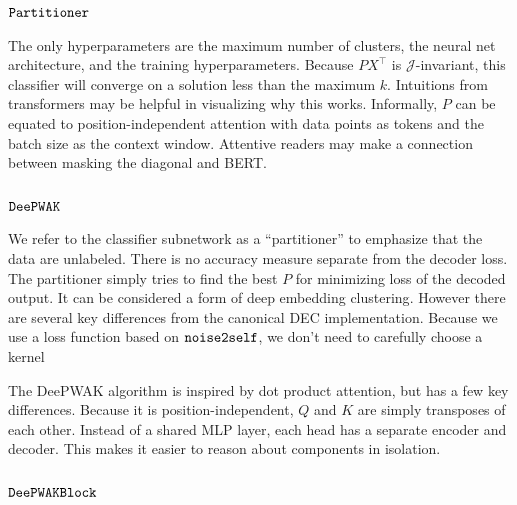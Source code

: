 \subsection{$\mathop{\mathtt{Partitioner}}\limits$}
\label{app:Partitioner}

The only hyperparameters are the maximum number of clusters, the neural net architecture, and the training hyperparameters.
Because $PX^\top$ is $\mathcal{J}$-invariant, this classifier will converge on a solution less than the maximum $k$.
Intuitions from transformers may be helpful in visualizing why this works.
Informally, $P$ can be equated to position-independent attention with data points as tokens and the batch size as the context window.
Attentive readers may make a connection between masking the diagonal and BERT.






\subsection{$\mathop{\mathtt{DeePWAK}}\limits$}
\label{app:DeePWAK}

We refer to the classifier subnetwork as a ``partitioner'' to emphasize that the data are unlabeled.
There is no accuracy measure separate from the decoder loss.
The partitioner simply tries to find the best $P$ for minimizing loss of the decoded output.
It can be considered a form of deep embedding clustering\cite{xie2016unsupervised}.
However there are several key differences from the canonical DEC implementation.
Because we use a loss function based on $\mathop{\mathtt{noise2self}}\limits$, we don't need to carefully choose a kernel

The DeePWAK algorithm is inspired by dot product attention, but has a few key differences.
Because it is position-independent, $Q$ and $K$ are simply transposes of each other.
Instead of a shared MLP layer, each head has a separate encoder and decoder.
This makes it easier to reason about components in isolation.





\subsection{$\mathop{\mathtt{DeePWAKBlock}}\limits$}






